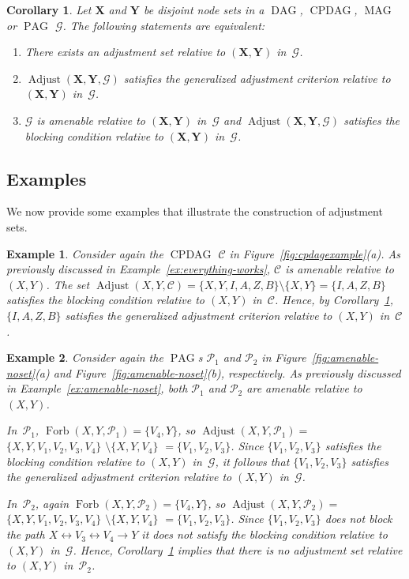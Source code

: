 \documentclass[11pt,a4paper]{article}
\newtheorem{corollary}[definition]{Corollary}
\newtheorem{example}{Example}
\DeclareMathOperator{\CPDAG}{CPDAG}
\DeclareMathOperator{\DAG}{DAG}
\DeclareMathOperator{\MAG}{MAG}
\DeclareMathOperator{\PAG}{PAG}
\DeclareMathOperator{\Adjust}{Adjust}
\DeclareMathOperator{\Forbi}{Forb}
\newcommand{\blck}{the blocking condition\xspace}
\newcommand{\g}[1][G]{\mathcal{#1}}
\newcommand{\adjust}[2][X,Y]{\Adjust(#1,#2)}
\newcommand{\adjustb}[2][X,Y]{\Adjust(\mathbf{#1},#2)}
\newcommand{\f}[2][X,Y]{\Forbi(#1,#2)}
\begin{document}
\begin{corollary}
Let $\mathbf{X}$ and $\mathbf{Y}$ be disjoint node sets in a $\DAG$, $\CPDAG$, $\MAG$ or $\PAG$ $\g$. The following statements are equivalent:
\begin{enumerate} [label = (\roman*)]
\item\label{cor-adjust-1} There exists an adjustment set relative to $(\mathbf{X,Y})$ in~$\g$.
\item\label{cor-adjust-2} $\adjustb{\g}$ satisfies the generalized adjustment criterion relative to $(\mathbf{X,Y})$ in~$\g$.
\item\label{cor-adjust-3} $\g$ is amenable relative to $(\mathbf{X,Y})$ in~$\g$ and $\adjustb{\g}$ satisfies \blck{} relative to $(\mathbf{X,Y})$ in~$\g$.
\end{enumerate}
\label{cor:adjust xy gac general}
\end{corollary}


\subsection{Examples} \label{subsec:examples2}
We now provide some examples that illustrate the construction of adjustment sets.
\begin{example}
Consider again the $\CPDAG$ $\g[C]$ in Figure~\ref{fig:cpdagexample}(a). As previously discussed in Example~\ref{ex:everything-works}, $\g[C]$ is amenable relative to $(X,Y)$.
The set $\adjust{\g[C]} = \{ X, Y, I, A, Z, B \} \setminus \{X,Y\} = \{I,A,Z,B \}$ satisfies \blck{} relative to $(X,Y)$ in~$\g[C]$. Hence, by Corollary~\ref{cor:adjust xy gac general}, $\{I,A,Z,B \}$ satisfies the generalized adjustment criterion relative to $(X,Y)$ in~$\g[C]$.
\label{ex:constr-everything-works}
\end{example}
\begin{example}
Consider again the $\PAG$s $\g[P]_1$ and $\g[P]_{2}$ in Figure~\ref{fig:amenable-noset}(a) and Figure~\ref{fig:amenable-noset}(b), respectively. As previously discussed in Example~\ref{ex:amenable-noset}, both $\g[P]_{1}$ and $\g[P]_{2}$ are amenable relative to $(X,Y)$.

In~$\g[P]_{1}$, $\f{\g[P]_{1}} = \{ V_4, Y \}$, so $\adjust{\g[P]_{1}} =$ $\{ X, Y, V_1, V_2, V_3, V_4\}$ $\setminus \{X,Y,V_4\} $ $ = \{V_1,V_2,V_3\}$. Since $\{V_1,V_2,V_3\}$ satisfies \blck{} relative to $(X,Y)$ in~$\g$, it follows that $\{V_1,V_2,V_3\}$ satisfies the generalized adjustment criterion relative to $(X,Y)$ in~$\g$.

In~$\g[P]_{2}$, again $\f{\g[P]_{2}} =\{ V_4, Y \}$, so $\adjust{\g[P]_{2}} =$ $\{ X, Y, V_1, V_2, V_3, V_4\}$ $\setminus \{X,Y,V_4\} $ $ = \{V_1,V_2,V_3\}$. Since $\{V_1,V_2,V_3\}$ does not block the path $X \leftrightarrow V_3 \leftrightarrow V_4 \rightarrow Y$ it does not satisfy \blck{} relative to $(X,Y)$ in~$\g$. Hence, Corollary~\ref{cor:adjust xy gac general} implies that there is no adjustment set relative to $(X,Y)$ in~$\g[P]_{2}$.
\label{ex:constr-amenable-noset}
\end{example}
\end{document}
